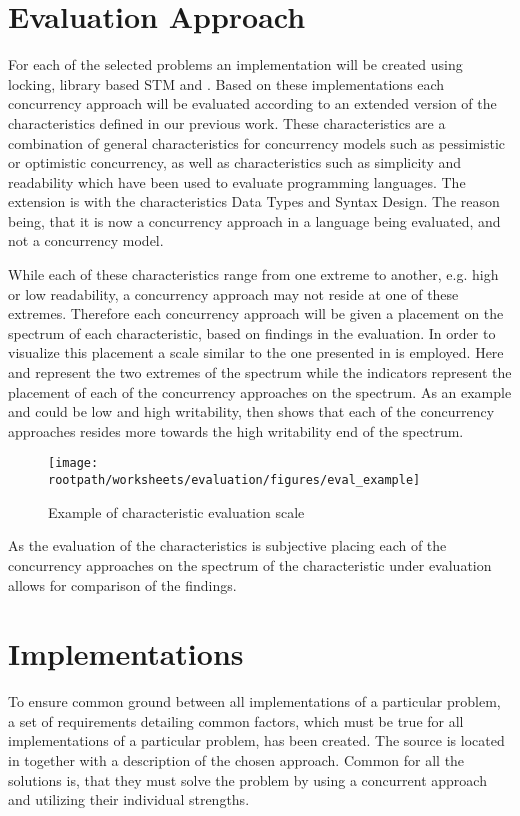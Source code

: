 \section{Evaluation Approach}
For each of the selected problems an implementation will be created using locking, library based \ac{STM} and \stmname. Based on these implementations each concurrency approach will be evaluated according to an extended version of the characteristics defined in our previous work\cite[p. 15-21]{dpt907e14trending}. These characteristics are a combination of general characteristics for concurrency models such as pessimistic or optimistic concurrency, as well as characteristics such as simplicity and readability which have been used to evaluate programming languages\cite[p. 7]{sebestaProLang}. The extension is with the characteristics Data Types and Syntax Design. The reason being, that it is now a concurrency approach in a language being evaluated, and not a concurrency model. 

While each of these characteristics range from one extreme to another, e.g. high or low readability, a concurrency approach may not reside at one of these extremes. Therefore each concurrency approach will be given a placement on the spectrum of each characteristic, based on findings in the evaluation. In order to visualize this placement a scale similar to the one presented in  is employed. Here  and  represent the two extremes of the spectrum while the indicators represent the placement of each of the concurrency approaches on the spectrum. As an example  and  could be low and high writability,  then shows that each of the concurrency approaches resides more towards the high writability end of the spectrum.
\begin{figure}[ht!]
\centering
\texttt{[image: \\rootpath/worksheets/evaluation/figures/eval\_example]}
\caption{Example of characteristic evaluation scale}\label{fig:evel_example}
\end{figure}
As the evaluation of the characteristics is subjective placing each of the concurrency approaches on the spectrum of the characteristic under evaluation allows for comparison of the findings.
\section{Implementations}
To ensure common ground between all implementations of a particular problem, a set of requirements detailing common factors, which must be true for all implementations of a particular problem, has been created. The source is located in \bsref{} together with a description of the chosen approach. Common for all the solutions is, that they must solve the problem by using a concurrent approach and utilizing their individual strengths.


